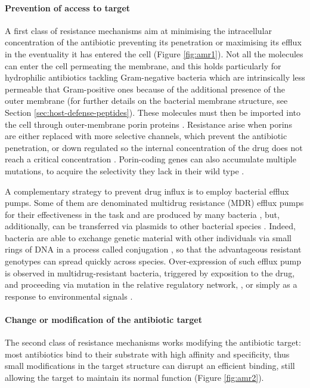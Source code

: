\paragraph{Prevention of access to target}
A first class of resistance mechanisms aim at minimising the intracellular concentration of the antibiotic preventing its penetration or maximising its efflux in the eventuality it has entered the cell (Figure \ref{fig:amr1}).
%
Not all the molecules can enter the cell permeating the membrane, and this holds particularly for hydrophilic antibiotics tackling Gram-negative bacteria which are intrinsically less permeable that Gram-positive ones because of the additional presence of the outer membrane \cite{Delcour2009} (for further details on the bacterial membrane structure, see Section \ref{sec:host-defense-peptides}).
%
These molecules must then be imported into the cell through outer-membrane porin proteins \cite{Vargiu2012,Kojima2013}. Resistance arise when porins are either replaced with more selective channels, which prevent the antibiotic penetration, or down regulated so the internal concentration of the drug does not reach a critical concentration \cite{Lavigne2013}. Porin-coding genes can also accumulate multiple mutations, to acquire the selectivity they lack in their wild type \cite{Poulou2013}.

A complementary strategy to prevent drug influx is to employ bacterial efflux pumps. Some of them are denominated multidrug resistance (MDR) efflux pumps for their effectiveness in the task and are produced by many bacteria \cite{Floyd2010,Ogawa2012}, but, additionally, can be transferred via plasmids to other bacterial species \cite{Dolejska2013}. Indeed, bacteria are able to exchange genetic material with other individuals via small rings of DNA in a process called conjugation \cite{????}, so that the advantageous resistant genotypes can spread quickly across species.
%
Over-expression of such efflux pump is observed in multidrug-resistant bacteria, triggered by exposition to the drug, and proceeding via mutation in the relative regulatory network, \cite{Abouzeed2008}, or simply as a response to environmental signals \cite{Nikaido2011}.


\paragraph{Change or modification of the antibiotic target}
The second class of resistance mechanisms works modifying the antibiotic target: most antibiotics bind to their substrate with high affinity and specificity, thus small modifications in the target structure can disrupt an efficient binding, still allowing the target to maintain its normal function (Figure \ref{fig:amr2}).

